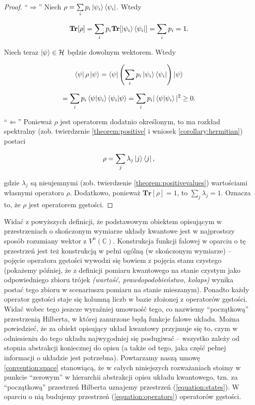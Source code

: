 \begin{proof}
    ``$\Longrightarrow$'' Niech $\rho = \sum\limits_{i} p_{i} \ket{\psi_i} \bra{\psi_i}$. Wtedy

    $$
        \textbf{Tr}[\rho] = \sum\limits_{i} p_{i} \textbf{Tr}[\ket{\psi_i} \bra{\psi_i}] = \sum\limits_{i} p_{i} = 1.
    $$

    Niech teraz $\ket{\psi} \in \mathcal{H}$ będzie dowolnym wektorem. Wtedy

    $$
        \bra{\psi} \rho \ket{\psi} = \bra{\psi} \left(\sum\limits_{i} p_{i} \ket{\psi_i} \bra{\psi_i}\right) \ket{\psi}
    $$

    $$
        = \sum\limits_{i} p_{i} \bra{\psi}\ket{\psi_i} \bra{\psi_i}\ket{\psi} = \sum\limits_{i} p_{i} |\bra{\psi}\ket{\psi_i}| ^ 2 \geq 0.
    $$

    ``$\Longleftarrow$'' Ponieważ $\rho$ jest operatorem dodatnio określonym, to ma rozkład spektralny (zob. twierdzenie \ref{theorem:positive} i wniosek \ref{corollary:hermitian}) postaci

    $$
        \rho = \sum\limits_{j} \lambda_{j} \ket{j} \bra{j},
    $$

    gdzie $\lambda_j$ są nieujemnymi (zob. twierdzenie \ref{theorem:positivevalues}) wartościami własnymi operatora $\rho$. Dodatkowo, ponieważ $\textbf{Tr}[\rho] = 1$, to $\sum\limits_{j} \lambda_{j} = 1$. Oznacza to, że $\rho$ jest operatorem gęstości.
\end{proof}

Widać z powyższych definicji, że podstawowym obiektem opisującym w przestrzeniach o skończonym wymiarze układy kwantowe jest w najprostszy sposób rozumiany wektor z $V ^ n(\mathbb{C})$. Konstrukcja funkcji falowej w oparciu o tę przestrzeń jest też konstrukcją w pełni ogólną (w skończonym wymiarze) -- pojęcie operatora gęstości wywodzi się bowiem z pojęcia stanu czystego (pokażemy później, że z definicji pomiaru kwantowego na stanie czystym jako odpowiedniego zbioru trójek \textit{(wartość, prawdopodobieństwo, kolaps)} wynika postać tego zbioru w scenariuszu pomiaru na stanie mieszanym). Ponadto każdy operator gęstości staje się kolumną liczb w bazie złożonej z operatorów gęstości. Widać wobec tego jeszcze wyraźniej umowność tego, co nazwiemy ``początkową'' przestrzenią Hilberta, w której zanurzone będą funkcje falowe układu. Można powiedzieć, że za obiekt opisujący układ kwantowy przyjmuje się to, czym w odniesieniu do tego układu najwygodniej się posługiwać -- wszystko zależy od stopnia abstrakcji koniecznej do opisu (a także od tego, jaka część pełnej informacji o układzie jest potrzebna). Powtarzamy naszą umowę \ref{convention:space} stanowiącą, że w całych niniejszych rozważaniach stoimy w punkcie ``zerowym'' w hierarchii abstrakcji opisu układu kwantowego, tzn. za ``początkową'' przestrzeń Hilberta uznajemy przestrzeń (\ref{equation:states}). W oparciu o nią budujemy przestrzeń (\ref{equation:operators}) operatorów gęstości.

